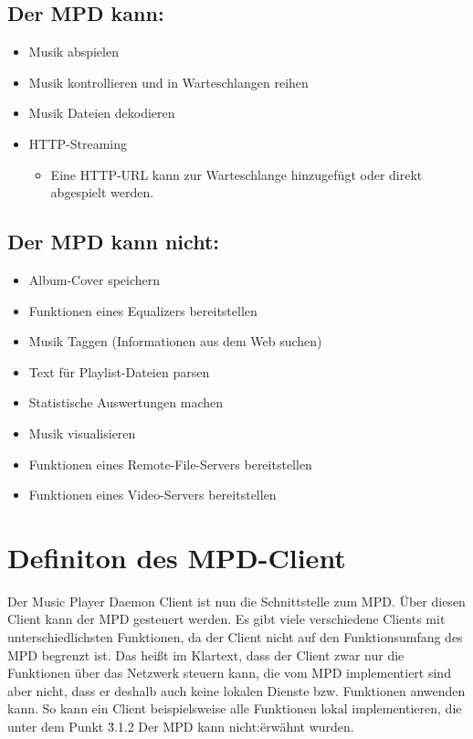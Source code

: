 \subsection{Der MPD kann:}
\renewcommand{\labelitemi}{•}
\begin{itemize}
    \item Musik abspielen
    \item Musik kontrollieren und in Warteschlangen reihen 
    \item Musik Dateien dekodieren
    \item HTTP-Streaming
        \renewcommand{\labelitemi}{--}
        \begin{itemize}
            \item Eine HTTP-URL kann zur Warteschlange hinzugefügt oder direkt abgespielt werden.\\
        \end{itemize}
\end{itemize}

\subsection{Der MPD kann nicht:}
\begin{itemize}
    \item Album-Cover speichern
    \item Funktionen eines Equalizers bereitstellen
    \item Musik Taggen (Informationen aus dem Web suchen)
    \item Text für Playlist-Dateien parsen
    \item Statistische Auswertungen machen
    \item Musik visualisieren
    \item Funktionen eines Remote-File-Servers bereitstellen
    \item Funktionen eines Video-Servers bereitstellen
\end{itemize}
\section{Definiton des MPD-Client}
Der Music Player Daemon Client ist nun die Schnittstelle zum MPD. Über diesen Client kann der MPD
gesteuert werden. Es gibt viele verschiedene Clients mit unterschiedlichsten Funktionen, da der 
Client nicht auf den Funktionsumfang des MPD begrenzt ist. Das heißt im Klartext, dass der Client
zwar nur die Funktionen über das Netzwerk steuern kann, die vom MPD implementiert sind aber nicht, 
dass er deshalb auch keine lokalen Dienste bzw. Funktionen anwenden kann. So kann ein Client 
beispielsweise alle Funktionen lokal implementieren, die unter dem Punkt \"3.1.2 Der MPD kann nicht:\" 
erwähnt wurden.
\newpage
